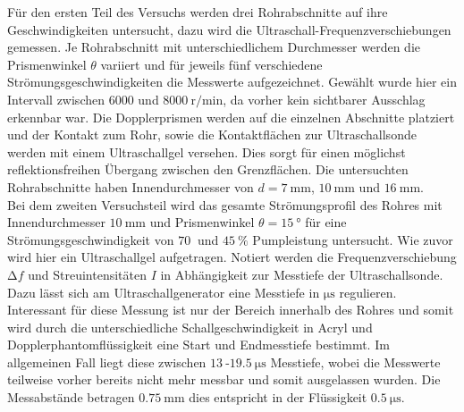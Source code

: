 Für den ersten Teil des Versuchs werden drei Rohrabschnitte auf ihre Geschwindigkeiten untersucht, dazu wird die Ultraschall-Frequenzverschiebungen gemessen. Je Rohrabschnitt mit unterschiedlichem Durchmesser werden die Prismenwinkel
$\theta$ variiert und für jeweils fünf verschiedene Strömungsgeschwindigkeiten die Messwerte aufgezeichnet. Gewählt wurde hier ein Intervall zwischen $6000$ und $\SI{8000}{{\text{r}}\per\minute}$, da vorher kein sichtbarer Ausschlag erkennbar war.
 Die Dopplerprismen werden auf die einzelnen Abschnitte platziert und der Kontakt zum Rohr, sowie die Kontaktflächen zur Ultraschallsonde
werden mit einem Ultraschallgel versehen. Dies sorgt für einen möglichst reflektionsfreihen Übergang zwischen den Grenzflächen.
Die untersuchten Rohrabschnitte haben Innendurchmesser von $d = \SI{7}{\milli\meter}$, $\SI{10}{\milli\meter}$ und $\SI{16}{\milli\meter}$.
\\
\newline
Bei dem zweiten Versuchsteil wird das gesamte Strömungsprofil des Rohres mit Innendurchmesser $\SI{10}{\milli\meter}$ und Prismenwinkel $\theta = \SI{15}{\degree}$ für eine Strömungsgeschwindigkeit von $\SI{70}{}$ und $\SI{45}{\percent}$ Pumpleistung untersucht. Wie zuvor wird hier ein Ultraschallgel aufgetragen. 
Notiert werden die Frequenzverschiebung $\increment f$ und Streuintensitäten $I$ in Abhängigkeit zur Messtiefe der Ultraschallsonde. Dazu lässt sich am Ultraschallgenerator eine Messtiefe in $\si{\micro\second}$ regulieren. 
Interessant für diese Messung ist nur der Bereich innerhalb des Rohres und somit wird durch die unterschiedliche Schallgeschwindigkeit in Acryl und Dopplerphantomflüssigkeit eine Start und Endmesstiefe bestimmt. Im allgemeinen
Fall liegt diese zwischen $\SI{13}{}$-$\SI{19.5}{\micro\second}$ Messtiefe, wobei die Messwerte teilweise vorher bereits nicht mehr messbar und somit ausgelassen wurden. Die Messabstände betragen $\SI{0.75}{\milli\meter}$ dies entspricht
in der Flüssigkeit $\SI{0.5}{\micro\second}$.